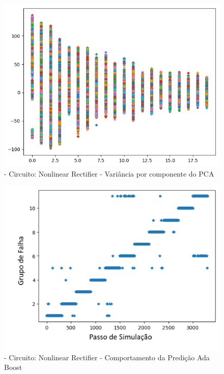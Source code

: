         \begin{figure}[H]
        \begin{center}
        \includegraphics[width=13cm]{./01_Pre_textuais/nonlin_figs/dadosPosPCA_Nonlinear_Rectfier_+_4bit_PRBS_[FALHA]_-_300_-_02sraw.png}
        \caption{\label{fig:pcaAPOSSalenkey}- Circuito: Nonlinear Rectifier - Variância por componente do PCA}
        \end{center}
        \end{figure}
        
        \begin{figure}[H]
        \begin{center}
        \includegraphics[width=13cm]{./01_Pre_textuais/nonlin_figs/AdaBoostClassifier_Nonlinear_Rectfier_+_4bit_PRBS_[FALHA]_-_300_-_02sraw.png}
        \caption{\label{fig:DecisionTreeClassifieSalenkey}- Circuito: Nonlinear Rectifier - Comportamento da Predição Ada Boost}
        \end{center}
        \end{figure}
       
